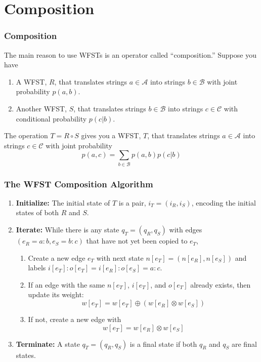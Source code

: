 \documentclass{beamer}
\begin{document}
\section[Composition]{Composition}
\setcounter{subsection}{1}

\begin{frame}
  \frametitle{Composition}

  The main reason to use WFSTs is an operator called ``composition.''
  Suppose you have
  \begin{enumerate}
  \item A WFST, $R$, that translates strings $a\in{\mathcal A}$ into
    strings $b\in{\mathcal B}$ with joint probability $p(a,b)$.
  \item Another WFST, $S$, that translates strings $b\in{\mathcal B}$
    into strings $c\in{\mathcal C}$ with conditional probability $p(c|b)$.
  \end{enumerate}
  The operation $T=R\circ S$ gives you a WFST, $T$, that translates
  strings $a\in{\mathcal A}$ into strings $c\in{\mathcal C}$ with
  joint probability
  \begin{displaymath}
    p(a,c) = \sum_{b\in{\mathcal B}} p(a,b)p(c|b)
  \end{displaymath}
\end{frame}

\begin{frame}
  \frametitle{The WFST Composition Algorithm}

  \begin{enumerate}
  \item {\bf Initialize:} The initial state of $T$ is a pair,
    $i_T=(i_R,i_S)$, encoding the initial states of both $R$ and $S$.
  \item {\bf Iterate:} While there is any state $q_T=(q_R,q_S)$ with
    edges $(e_R=a:b,e_S=b:c)$ that have not yet been copied to $e_T$,
    \begin{enumerate}
    \item Create a new edge $e_T$ with next state $n[e_T]=(n[e_R],n[e_S])$
      and labels $i[e_T]:o[e_T]=i[e_R]:o[e_S] =a:c$.
    \item If an edge with the same $n[e_T]$, $i[e_T]$, and $o[e_T]$ already exists, then update
      its weight:
      \[
      w[e_T] = w[e_T]\oplus (w[e_R]\otimes w[e_S])
      \]
    \item If not, create a new edge with
      \[
      w[e_T] = w[e_R]\otimes w[e_S]
      \]
    \end{enumerate}
  \item {\bf Terminate:} A state $q_T=(q_R,q_S)$ is a final state
    if both $q_R$ and $q_S$ are final states.
  \end{enumerate}
\end{frame}
\end{document}
